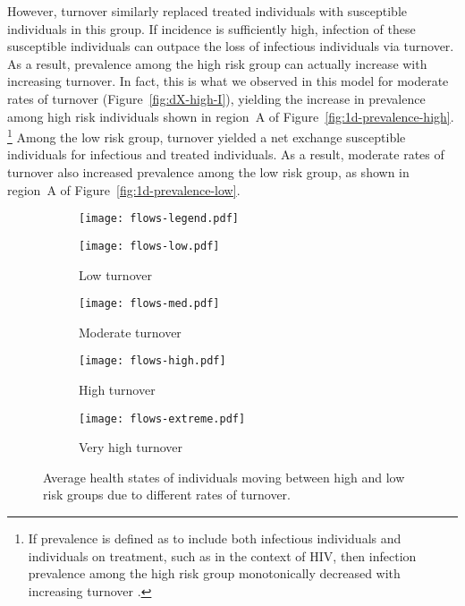 However, turnover similarly replaced treated individuals
with susceptible individuals in this group.
If incidence is sufficiently high,
infection of these susceptible individuals can
outpace the loss of infectious individuals via turnover.
As a result, prevalence among the high risk group
can actually increase with increasing turnover.
In fact, this is what we observed in this model for moderate rates of turnover
(Figure~\ref{fig:dX-high-I}),
yielding the increase in prevalence among high risk individuals
shown in region~A of Figure~\ref{fig:1d-prevalence-high}.%
\footnote{If prevalence is defined as to include
  both infectious individuals and individuals on treatment,
  such as in the context of HIV,
  then infection prevalence among the high risk group
  monotonically decreased with increasing turnover \citep{Knight2019}.}
Among the low risk group, turnover yielded a net exchange susceptible individuals
for infectious and treated individuals.
As a result, moderate rates of turnover also
increased prevalence among the low risk group,
as shown in region~A of Figure~\ref{fig:1d-prevalence-low}.
\par
\begin{figure}[!tbp]
  \centering
  \begin{subfigure}[t]{0.6\linewidth}
    \centering
    \texttt{[image: flows-legend.pdf]}
  \end{subfigure}
  \begin{subfigure}[t]{0.2\linewidth}
    \centering
    \texttt{[image: flows-low.pdf]}
    \caption{Low turnover}
    \label{fig:flows-low}
  \end{subfigure}%
  \begin{subfigure}[t]{0.2\linewidth}
    \centering
    \texttt{[image: flows-med.pdf]}
    \caption{Moderate turnover}
    \label{fig:flows-med}
  \end{subfigure}%
  \begin{subfigure}[t]{0.2\linewidth}
    \centering
    \texttt{[image: flows-high.pdf]}
    \caption{High turnover}
    \label{fig:flows-high}
  \end{subfigure}%
  \begin{subfigure}[t]{0.2\linewidth}
    \centering
    \texttt{[image: flows-extreme.pdf]}
    \caption{Very high turnover}
    \label{fig:flows-extreme}
  \end{subfigure}
  \caption{Average health states of individuals
    moving between high and low risk groups due to different rates of turnover.}
  \label{fig:flows}
\end{figure}
